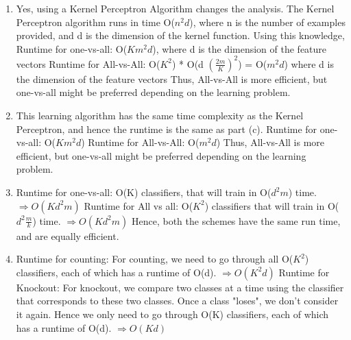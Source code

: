 \documentclass[11pt]{article}
\begin{document}
\begin{enumerate}
\item
Yes, using a Kernel Perceptron Algorithm changes the analysis. The Kernel 
Perceptron algorithm runs in time O($n^2 d$), where n is the number of examples
provided, and d is the dimension of the kernel function. \newline
Using this knowledge, \newline
Runtime for one-vs-all: O($Km^2d$), where d is the dimension of the feature vectors \newline
Runtime for All-vs-All: O($K^2$) * O(d $\left(\frac{2m}{K}\right)^2$) = O($m^2 d$) where d is the dimension of the feature vectors  \newline
Thus, All-vs-All is more efficient, but one-vs-all might be preferred depending on the learning
problem.

\item
This learning algorithm has the same time complexity as the Kernel Perceptron,
and hence the runtime is the same as part (c). \newline
Runtime for one-vs-all: O($Km^2d$) \newline
Runtime for All-vs-All: O($m^2 d$) \newline
Thus, All-vs-All is more efficient, but one-vs-all might be preferred depending on the learning
problem.

\item
Runtime for one-vs-all: O(K) classifiers, that will train in O($d^2m$) time. $\Rightarrow O(Kd^2m)$ \newline
Runtime for All vs all: O($K^2$) classifiers that will train in O($d^2 \frac{m}{k}$) time. $\Rightarrow O(Kd^2m)$ \newline
Hence, both the schemes have the same run time, and are equally efficient.

\item
Runtime for counting: For counting, we need to go through all O($K^2$) classifiers, each of which has 
a runtime of O(d). $\Rightarrow O(K^2 d)$ \newline
Runtime for Knockout: For knockout, we compare two classes at a time using the classifier that corresponds
to these two classes. Once a class "loses", we don't consider it again. Hence we only need to go through
O(K) classifiers, each of which has a runtime of O(d).
$\Rightarrow O(Kd)$
\end{enumerate}
\end{document}
